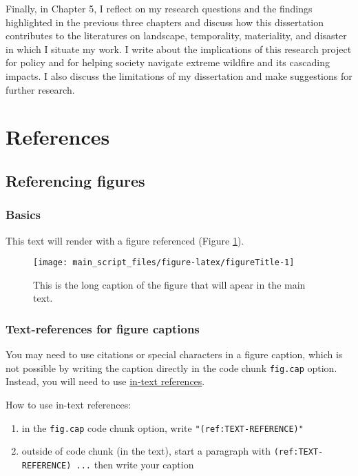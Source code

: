 \documentclass[
]{article}
\providecommand{\tightlist}{%
  \setlength{\itemsep}{0pt}\setlength{\parskip}{0pt}}
\begin{document}
Finally, in Chapter 5, I reflect on my research questions and the findings highlighted in the previous three chapters and discuss how this dissertation contributes to the literatures on landscape, temporality, materiality, and disaster in which I situate my work. I write about the implications of this research project for policy and for helping society navigate extreme wildfire and its cascading impacts. I also discuss the limitations of my dissertation and make suggestions for further research.

\section{References}\label{references}

\subsection{Referencing figures}\label{referencing-figures}

\subsubsection{Basics}\label{basics}

This text will render with a figure referenced (Figure \ref{fig:figureTitle}).

\begin{figure}
\texttt{[image: main\_script\_files/figure-latex/figureTitle-1]} \caption[This is the short title for the figure list]{This is the long caption of the figure that will apear in the main text.}\label{fig:figureTitle}
\end{figure}

\subsubsection{Text-references for figure captions}\label{text-references-for-figure-captions}

You may need to use citations or special characters in a figure caption, which is not possible by writing the caption directly in the code chunk \texttt{fig.cap} option. Instead, you will need to use \href{https://bookdown.org/yihui/bookdown/markdown-extensions-by-bookdown.html\#text-references}{in-text references}.

How to use in-text references:

\begin{enumerate}
\def\labelenumi{\arabic{enumi}.}
\tightlist
\item
  in the \texttt{fig.cap} code chunk option, write \texttt{"(ref:TEXT-REFERENCE)"}
\item
  outside of code chunk (in the text), start a paragraph with \texttt{(ref:TEXT-REFERENCE)\ ...} then write your caption
\end{enumerate}
\end{document}
